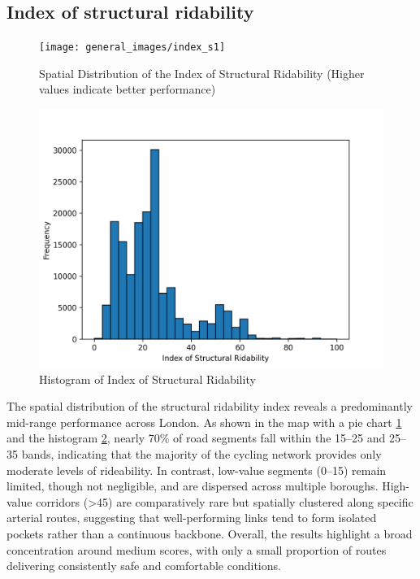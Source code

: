\documentclass[
  12pt,
  oneside]{book}
\begin{document}
\subsection{Index of structural ridability}\label{index-of-structural-ridability}

\begin{figure}

{\centering \texttt{[image: general\_images/index\_s1]} 

}

\caption{Spatial Distribution of the Index of Structural Ridability (Higher values indicate better performance)}\label{fig:indexs1}
\end{figure}

\begin{figure}

{\centering \includegraphics[width=1\linewidth]{general_images/index1histogram} 

}

\caption{Histogram of Index of Structural Ridability}\label{fig:indexs1histogram}
\end{figure}

The spatial distribution of the structural ridability index reveals a predominantly mid-range performance across London. As shown in the map with a pie chart \ref{fig:indexs1} and the histogram \ref{fig:indexs1histogram}, nearly 70\% of road segments fall within the 15--25 and 25--35 bands, indicating that the majority of the cycling network provides only moderate levels of rideability. In contrast, low-value segments (0--15) remain limited, though not negligible, and are dispersed across multiple boroughs. High-value corridors (\textgreater45) are comparatively rare but spatially clustered along specific arterial routes, suggesting that well-performing links tend to form isolated pockets rather than a continuous backbone. Overall, the results highlight a broad concentration around medium scores, with only a small proportion of routes delivering consistently safe and comfortable conditions.
\end{document}
